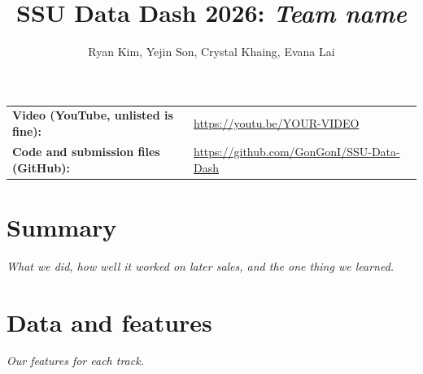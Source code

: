 \documentclass[11pt]{article}
\title{SSU Data Dash 2026: \textit{Team name}}
\author{Ryan Kim, Yejin Son, Crystal Khaing, Evana Lai}
\date{}
\begin{document}
\maketitle

\noindent\begin{tabular}{@{}ll}
\textbf{Video (YouTube, unlisted is fine):} & \url{https://youtu.be/YOUR-VIDEO} \\
\textbf{Code and submission files (GitHub):} & \url{https://github.com/GonGonI/SSU-Data-Dash} \\
\end{tabular}

\section*{Summary}
\textit{What we did, how well it worked on later sales, and the one thing we learned.}

\section{Data and features}
\textit{Our features for each track.}
\end{document}
